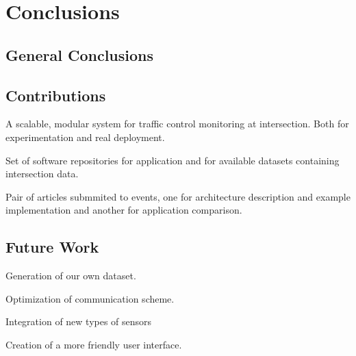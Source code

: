 \chapter {Conclusions}

\section{General Conclusions}
\section{Contributions}

A scalable, modular system for traffic control monitoring at intersection. Both for experimentation and real deployment.

Set of software repositories for application and for available datasets containing intersection data.

Pair of articles submmited to events, one for architecture description and example implementation and another for application comparison. 

\section{Future Work}

Generation of our own dataset.

Optimization of communication scheme.

Integration of new types of sensors

Creation of a more friendly user interface.
